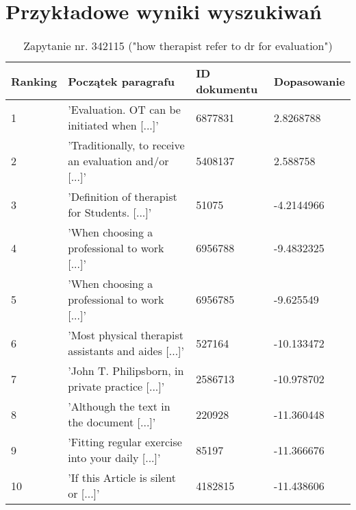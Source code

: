 \section{Przykładowe wyniki wyszukiwań}


\begin{table}[htp!]
\centering
\caption{Zapytanie nr. 342115 ("how therapist refer to dr for evaluation")\protect\footnotemark[2]}
\vspace*{5mm}
\begin{tabular}{llll}
   Ranking & Początek paragrafu & ID dokumentu & Dopasowanie \\
   \hline
    1 & 'Evaluation. OT can be initiated when [...]' & 6877831 & 2.8268788 \\
    2 & 'Traditionally, to receive an evaluation and/or [...]' & 5408137 &  2.588758\\
    3 & 'Definition of therapist for Students. [...]' & 51075 & -4.2144966 \\
    4 & 'When choosing a professional to work [...]' & 6956788 & -9.4832325 \\
    5 & 'When choosing a professional to work [...]' & 6956785 &  -9.625549\\
    6 & 'Most physical therapist assistants and aides [...]' & 527164 &   -10.133472\\
    7 & 'John T. Philipsborn, in private practice [...]' & 2586713 & -10.978702 \\
    8 & 'Although the text in the document [...]' & 220928 &  -11.360448\\
    9 & 'Fitting regular exercise into your daily [...]' & 85197 &  -11.366676\\
    10 & 'If this Article is silent or [...]' & 4182815 &  -11.438606\\

\end{tabular}
\end{table}

